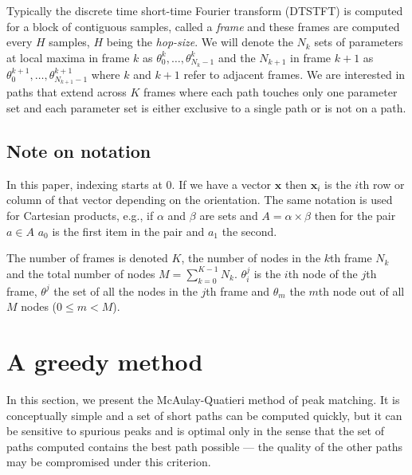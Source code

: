 \documentclass{article}
\newcommand{\BS}[1]{\boldsymbol{#1}}
\begin{document}
\begin{sloppy}
Typically the discrete time short-time Fourier transform (DTSTFT) is computed
for a block of contiguous samples, called a \textit{frame} and these frames are
computed every $H$ samples, $H$ being the \textit{hop-size}. We will denote the
$N_{k}$ sets of parameters at local maxima in frame $k$ as $\theta_0^{k},
\dotsc, \theta_{N_{k}-1}^{k}$ and the $N_{k+1}$ in frame $k+1$ as
$\theta_0^{k+1}, \dotsc, \theta_{N_{k+1}-1}^{k+1}$ where $k$ and $k+1$ refer to
adjacent frames. We are interested in paths that extend across $K$ frames where
each path touches only one parameter set and each parameter set is either
exclusive to a single path or is not on a path.

\subsection{Note on notation}

In this paper, indexing starts at 0. If we have a vector $\BS{x}$ then
$\BS{x}_{i}$ is the $i$th row or column of that vector depending on the
orientation. The same notation is used for Cartesian products, e.g., if $\alpha$
and $\beta$ are sets and $A =
\alpha \times \beta$ then for the pair $a \in A$ $a_{0}$ is the first item in
the pair and $a_{1}$ the second.

The number of frames is denoted $K$, the number of nodes in the $k$th frame $N_k$ and
the total number of nodes $M = \sum_{k=0}^{K-1} N_{k}$. $\theta_{i}^{j}$ is the
$i$th node of the $j$th frame, $\theta^{j}$ the set of all the nodes in the
$j$th frame and $\theta_{m}$ the $m$th node out of all $M$ nodes ($0 \leq m <
M$).


\section{A greedy method}

In this section, we present the McAulay-Quatieri method of peak matching. It is
conceptually simple and a set of short paths can be computed quickly, but
it can be sensitive to spurious peaks and is optimal only in the sense that
the set of paths computed contains the best path possible --- the quality of the
other paths may be compromised under this criterion.


\end{sloppy}
\end{document}
